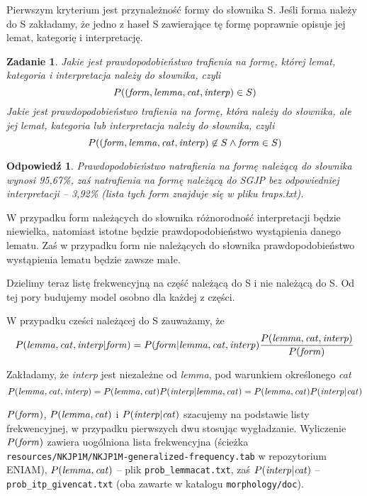 \documentclass{article}
\newcommand{\form}{{\it form}}
\newcommand{\lemma}{{\it lemma}}
\newcommand{\cat}{{\it cat}}
\newcommand{\interp}{{\it interp}}
\newtheorem{task}{Zadanie}
\newtheorem{answer}{Odpowiedź}
\begin{document}

Pierwszym kryterium jest przynależność formy do słownika S. 
Jeśli forma należy do S zakładamy, że jedno z haseł S zawierające tę formę
poprawnie opisuje jej lemat, kategorię i interpretację.

\begin{task}
Jakie jest prawdopodobieństwo trafienia na formę, której lemat, kategoria i interpretacja należy do słownika, czyli
\[P((\form,\lemma,\cat,\interp) \in S)\]
Jakie jest prawdopodobieństwo trafienia na formę, która należy do słownika, ale jej lemat, kategoria lub interpretacja należy do słownika, czyli
\[P((\form,\lemma,\cat,\interp) \not\in S \wedge \form \in S)\]
\end{task}

\begin{answer}
Prawdopodobieństwo natrafienia na formę należącą do słownika wynosi 95,67\%, zaś natrafienia na formę należącą do SGJP bez odpowiedniej
interpretacji -- 3,92\% (lista tych form znajduje się w pliku traps.txt).
\end{answer}

W przypadku form należących do słownika różnorodność interpretacji będzie niewielka, 
natomiast istotne będzie prawdopodobieństwo wystąpienia danego lematu.
Zaś w przypadku form nie należących do słownika prawdopodobieństwo wystąpienia lematu
będzie zawsze małe.

Dzielimy teraz listę frekwencyjną na część należącą do S i nie należącą do S. 
Od tej pory budujemy model osobno dla każdej z części.

W przypadku cześci należącej do S zauważamy, że \[P(\lemma,\cat,\interp|\form)=P(\form|\lemma,\cat,\interp)\frac{P(\lemma,\cat,\interp)}{P(\form)}\]

Zakładamy, że \interp{} jest niezależne od \lemma, pod warunkiem określonego \cat
\[P(\lemma,\cat,\interp)=P(\lemma,\cat)P(\interp|\lemma,\cat)=P(\lemma,\cat)P(\interp|\cat)\]

$P(\form)$, $P(\lemma,\cat)$ i $P(\interp|\cat)$ szacujemy na podstawie listy frekwencyjnej,
w przypadku pierwszych dwu stosując wygładzanie. Wyliczenie $P(\form)$ zawiera uogólniona lista frekwencyjna
(ścieżka {\tt resources/NKJP1M/NKJP1M-generalized-frequency.tab} w repozytorium ENIAM), $P(\lemma,\cat)$ -- plik
 {\tt prob\_lemmacat.txt}, zaś $P(\interp|\cat)$ -- {\tt prob\_itp\_givencat.txt} (oba zawarte w katalogu {\tt morphology/doc}).
\end{document}
